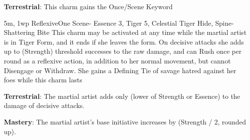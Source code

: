 \textbf{Terrestrial}: This charm gains the Once/Scene Keyword

{5m, 1wp}
{Reflexive}{One Scene}{-}
{Essence 3, Tiger 5, Celestial Tiger Hide, Spine-Shattering Bite}
This charm may be activated at any time while the martial artist is in Tiger Form, and it ends if she leaves the form. On decisive attacks she adds up to (Strength) threshold successes to the raw damage, and can Rush once per round as a reflexive action, in addition to her normal movement, but cannot Disengage or Withdraw. She gains a Defining Tie of savage hatred against her foes while this charm lasts

\textbf{Terrestrial}: The martial artist adds only (lower of Strength or Essence) to the damage of decisive attacks.

\textbf{Mastery}: The martial artist's base initiative increases by (Strength / 2, rounded up).

